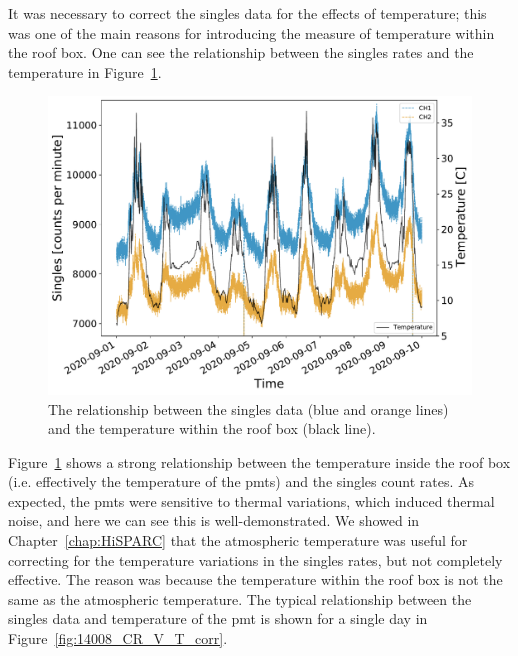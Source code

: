 It was necessary to correct the singles data for the effects of temperature; this was one of the main reasons for introducing the measure of temperature within the roof box. One can see the relationship between the singles rates and the temperature in Figure~\ref{fig:HS_14008_temperature_vs_CR}.

\begin{figure}[ht!]
	\centering
	\includegraphics[width=0.7\columnwidth]{HS_14008_CR_v_T_sept2020.pdf}
	\caption{The relationship between the singles data (blue and orange lines) and the temperature within the roof box (black line).}
	\label{fig:HS_14008_temperature_vs_CR}
\end{figure}


Figure~\ref{fig:HS_14008_temperature_vs_CR} shows a strong relationship between the temperature inside the roof box (i.e. effectively the temperature of the \glspl{pmt}) and the singles count rates. As expected, the \glspl{pmt} were sensitive to thermal variations, which induced thermal noise, and here we can see this is well-demonstrated. We showed in Chapter~\ref{chap:HiSPARC} that the atmospheric temperature was useful for correcting for the temperature variations in the singles rates, but not completely effective. The reason was because the temperature within the roof box is not the same as the atmospheric temperature. The typical relationship between the singles data and temperature of the \gls{pmt} is shown for a single day in Figure~\ref{fig:14008_CR_V_T_corr}.

